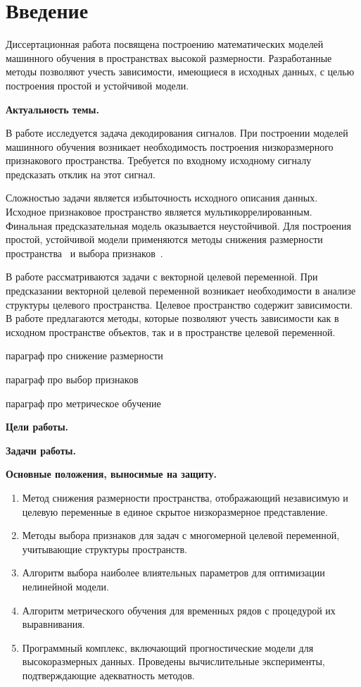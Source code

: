 \chapter*{Введение}

Диссертационная работа посвящена построению математических моделей машинного обучения в пространствах высокой размерности.
Разработанные методы позволяют учесть зависимости, имеющиеся в исходных данных, с целью построения простой и устойчивой модели.


\textbf{Актуальность темы.} 

В работе исследуется задача декодирования сигналов. 
При построении моделей машинного обучения возникает необходимость построения низкоразмерного признакового пространства. 
Требуется по входному исходному сигналу предсказать отклик на этот сигнал.

Сложностью задачи является избыточность исходного описания данных. 
Исходное признаковое пространство является мультикоррелированным.
Финальная предсказательная модель оказывается неустойчивой.
Для построения простой, устойчивой модели применяются методы снижения размерности пространства~\cite{chun2010sparse,mehmood2012review}  и выбора признаков~\cite{katrutsa2015stress,li2017feature}.

В работе рассматриваются задачи с векторной целевой переменной. 
При предсказании векторной целевой переменной возникает необходимости в анализе структуры целевого пространства.
Целевое пространство содержит зависимости.
В работе предлагаются методы, которые позволяют учесть зависимости как в исходном пространстве объектов, так и в пространстве целевой переменной.

{\color{red} параграф про снижение размерности}

{\color{red} параграф про выбор признаков}

{\color{red} параграф про метрическое обучение}

\vspace{0.5cm}
\textbf{Цели работы.}

\vspace{0.5cm}
\textbf{Задачи работы.}

\vspace{0.5cm}
\textbf{Основные положения, выносимые на защиту.}
\begin{enumerate}
	\item Метод снижения размерности пространства, отображающий независимую и целевую переменные в единое скрытое низкоразмерное представление.
	\item Методы выбора признаков для задач с многомерной целевой переменной, учитывающие структуры пространств.
	\item Алгоритм выбора наиболее влиятельных параметров для оптимизации нелинейной модели.
	\item Алгоритм метрического обучения для временных рядов с процедурой их выравнивания.
	\item Программный комплекс, включающий прогностические модели для высокоразмерных данных. Проведены вычислительные эксперименты, подтверждающие адекватность методов.
\end{enumerate}

